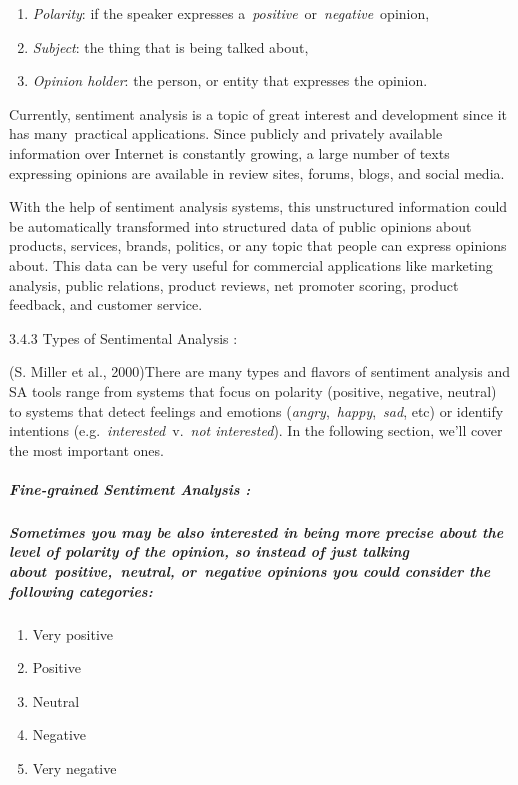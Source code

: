 \documentclass{article} %
\begin{document}
\begin{enumerate}
\item  \textit{Polarity}: if the speaker expresses a~\textit{positive}~or~\textit{negative}~opinion,

\item  \textit{Subject}: the thing that is being talked about,

\item  \textit{Opinion holder}: the person, or entity that expresses the opinion.
\end{enumerate}

Currently, sentiment analysis is a topic of great interest and development since it has many~practical applications. Since publicly and privately available information over Internet is constantly growing, a large number of texts expressing opinions are available in review sites, forums, blogs, and social media.

With the help of sentiment analysis systems, this unstructured information could be automatically transformed into structured data of public opinions about products, services, brands, politics, or any topic that people can express opinions about. This data can be very useful for commercial applications like marketing analysis, public relations, product reviews, net promoter scoring, product feedback, and customer service. 



3.4.3 Types of Sentimental Analysis : 

(S. Miller et al., 2000)There are many types and flavors of sentiment analysis and SA tools range from systems that focus on polarity (positive, negative, neutral) to systems that detect feelings and emotions (\textit{angry},~\textit{happy},~\textit{sad}, etc) or identify intentions (e.g.~\textit{interested}~v.~\textit{not interested}). In the following section, we'll cover the most important ones.


\subparagraph{ Fine-grained Sentiment Analysis : }


\subparagraph{Sometimes you may be also interested in being more precise about the level of polarity of the opinion, so instead of just talking about~positive,~neutral, or~negative opinions you could consider the following categories:}

\begin{enumerate}
\item  Very positive

\item  Positive

\item  Neutral

\item  Negative

\item  Very negative
\end{enumerate}
\end{document}
